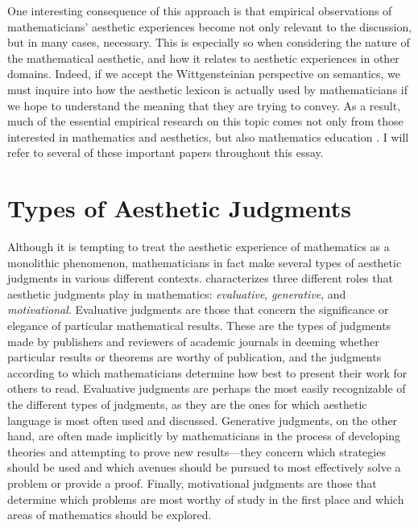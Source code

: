 \documentclass[a4paper,man,natbib]{apa6}
\begin{document}
One interesting consequence of this approach is that empirical observations of mathematicians' aesthetic experiences
become not only relevant to the discussion, but in many cases, necessary. This is especially so when considering the 
nature of the mathematical aesthetic, and how it relates to aesthetic experiences in other domains. Indeed, if we accept the
Wittgensteinian perspective on semantics, we must inquire into how the aesthetic lexicon is actually used by mathematicians if we hope to 
understand the meaning that they are trying to convey. As a result, much of the essential empirical research on this topic comes not only 
from those interested in mathematics and aesthetics, but also mathematics education \citep{dreyfus_aesthetics_1986,
inglis_beauty_2015,larvor_diversity_2016,inglis_are_2020,sa_mathematicians_2023}. I will refer to several of these 
important papers throughout this essay.

\section{Types of Aesthetic Judgments}
Although it is tempting to treat the aesthetic experience of mathematics as a monolithic phenomenon, mathematicians in
fact make several types of aesthetic judgments in various different contexts. 
\cite{sinclair_roles_2004,sinclair_aesthetic_2011} characterizes three different roles that aesthetic judgments play in mathematics:
\textit{evaluative}, \textit{generative}, and \textit{motivational}. Evaluative judgments are those that concern
the significance or elegance of particular mathematical results. These are the types of judgments made by publishers and
reviewers of academic journals in deeming whether particular results or theorems are worthy of 
publication, and the judgments according to which mathematicians determine how best to present their work for 
others to read. Evaluative judgments are perhaps the most easily recognizable
of the different types of judgments, as they are the ones for which aesthetic language is most often used and discussed.
Generative judgments, on the other hand, are often made implicitly by mathematicians in the process of developing theories
and attempting to prove new results---they concern which strategies should be used and which avenues should be pursued
to most effectively solve a problem or provide a proof. Finally, motivational judgments are those that determine which
problems are most worthy of study in the first place and which areas of mathematics should be explored.
\end{document}
